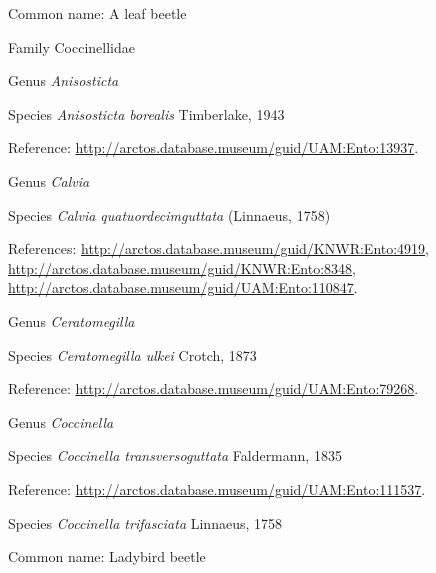 \documentclass[9pt, article]{memoir}
\begin{document}
\begin{multicols}{2}
Common name: A leaf beetle

\vspace{6pt}\noindent\hspace{24pt}Family Coccinellidae


\vspace{6pt}\noindent\hspace{30pt}Genus \textit{Anisosticta}


\vspace{6pt}\noindent\hspace{36pt}Species \textit{Anisosticta borealis} Timberlake, 1943


Reference: 
\url{http://arctos.database.museum/guid/UAM:Ento:13937}.

\vspace{6pt}\noindent\hspace{30pt}Genus \textit{Calvia}


\vspace{6pt}\noindent\hspace{36pt}Species \textit{Calvia quatuordecimguttata} (Linnaeus, 1758)


References: 
\url{http://arctos.database.museum/guid/KNWR:Ento:4919}, 
\url{http://arctos.database.museum/guid/KNWR:Ento:8348}, 
\url{http://arctos.database.museum/guid/UAM:Ento:110847}.

\vspace{6pt}\noindent\hspace{30pt}Genus \textit{Ceratomegilla}


\vspace{6pt}\noindent\hspace{36pt}Species \textit{Ceratomegilla ulkei} Crotch, 1873


Reference: 
\url{http://arctos.database.museum/guid/UAM:Ento:79268}.

\vspace{6pt}\noindent\hspace{30pt}Genus \textit{Coccinella}


\vspace{6pt}\noindent\hspace{36pt}Species \textit{Coccinella transversoguttata} Faldermann, 1835


Reference: 
\url{http://arctos.database.museum/guid/UAM:Ento:111537}.

\vspace{6pt}\noindent\hspace{36pt}Species \textit{Coccinella trifasciata} Linnaeus, 1758


Common name: Ladybird beetle


\end{multicols}
\end{document}
